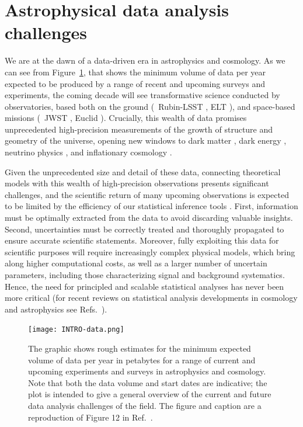 \section{Astrophysical data analysis challenges}\label{sec:astro}

We are at the dawn of a data-driven era in astrophysics and cosmology. As we can see from Figure~\ref{fig:intro-data}, that shows the minimum volume of data per year expected to be produced by a range of recent and upcoming surveys and experiments, the coming decade will see transformative science conducted by observatories, based both on the ground (\eg\ Rubin-LSST \cite{LSSTDarkEnergyScience:2012kar}, ELT \cite{Simon:2019aa}), and space-based missions (\eg\ JWST \citep{Gardner:2006ky}, Euclid \cite{Refregier:2010ss}). Crucially, this wealth of data promises unprecedented high-precision measurements of the growth of structure and geometry of the universe, opening new windows to dark matter \cite{Cirelli:2024ssz, drlicawagner2022reporttopicalgroupcosmic}, dark energy \cite{Mortonson:2013zfa, Huterer:2017buf}, neutrino physics \cite{Boyarsky:2012rt, SajjadAthar:2021prg}, and inflationary cosmology \cite{Baumann:2009ds, Achucarro:2022qrl}.

Given the unprecedented size and detail of these data, connecting theoretical models with this wealth of high-precision observations presents significant challenges, and the scientific return of many upcoming observations is expected to be limited by the efficiency of our statistical inference tools \cite{AlvesBatista:2021eeu, Green:2022hhj}. First, information must be optimally extracted from the data to avoid discarding valuable insights. Second, uncertainties must be correctly treated and thoroughly propagated to ensure accurate scientific statements. Moreover, fully exploiting this data for scientific purposes will require increasingly complex physical models, which bring along higher computational costs, as well as a larger number of uncertain parameters, including those characterizing signal and background systematics. Hence, the need for principled and scalable statistical analyses has never been more critical (for recent reviews on statistical analysis developments in cosmology and astrophysics see Refs.~\cite{Trotta:2017wnx, verde2010statistical, feigelson2021twenty}).

\begin{figure}
    \centering
	\texttt{[image: INTRO-data.png]}
    \caption{The graphic shows rough estimates for the minimum expected volume of data per year in petabytes for a range of current and upcoming experiments and surveys in astrophysics and cosmology. Note that both the data volume and start dates are indicative; the plot is intended to give a general overview of the current and future data analysis challenges of the field. The figure and caption are a reproduction of Figure 12 in Ref.~\cite{AlvesBatista:2021eeu}.}
    \label{fig:intro-data}
\end{figure}

